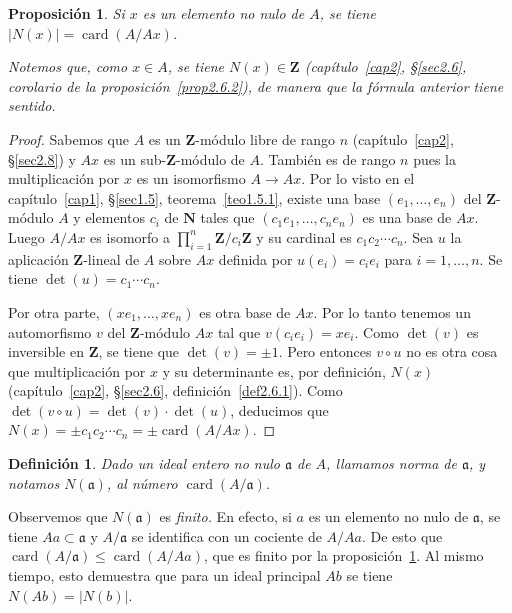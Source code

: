 \documentclass[10pt,oneside,bibtotoc,smallheadings,leqno,a5paper,DIV=12]{scrbook}
\newcommand{\ZZ}{\mathbf{Z}}
\newcommand{\NN}{\mathbf{N}}
\newcommand{\idl}[1]{\mathfrak{#1}}
\newcommand{\QED}{}%
\newcommand{\abs}[1]{\left\lvert#1\right\rvert}
\renewcommand{\to}[1][]{\xrightarrow{#1}}
\DeclareMathOperator{\card}{card}
\numberwithin{equation}{section}
\newenvironment{comm}%
	{\begin{trivlist}\item\small\itshape}
	{\end{trivlist}}
\theoremstyle{defi}
\newtheorem{definition}{Definici\'on}
\theoremstyle{enonce}
\newtheorem{proposition}{Proposici\'on}
\theoremstyle{rem}
\numberwithin{theorem}{section}
\numberwithin{proposition}{section}
\numberwithin{definition}{section}
\numberwithin{lemma}{section}
\numberwithin{corollary}{section}
\numberwithin{example}{section}
\numberwithin{footnote}{section}%
\begin{document}
\begin{proposition}\label{prop3.5.1}
Si $x$ es un elemento no nulo de $A$, se tiene $\abs{N(x)} = \card(A/Ax)$.
\end{proposition}

\begin{comm}
Notemos que, como $x\in A$, se tiene $N(x)\in\ZZ$ (cap\'itulo~\ref{cap2}, \S\ref{sec2.6}, corolario de la
proposici\'on~\ref{prop2.6.2}), de manera que
la f\'ormula anterior tiene sentido.
\end{comm}

\begin{proof}
Sabemos que $A$ es un $\ZZ$-m\'odulo libre de rango $n$ (cap\'itulo~\ref{cap2}, \S\ref{sec2.8}) y $Ax$ es un
sub-$\ZZ$-m\'odulo de $A$. Tambi\'en es de rango $n$ pues la multiplicaci\'on por $x$
es un isomorfismo $A\to Ax$. Por lo visto en el cap\'itulo~\ref{cap1}, \S\ref{sec1.5}, teorema~\ref{teo1.5.1}, existe una base
$(e_{1},\dots,e_{n})$ del $\ZZ$-m\'odulo $A$ y elementos $c_{i}$ de $\NN$ tales que
$(c_{1}e_{1},\dots,c_{n}e_{n})$ es una base de $Ax$. Luego $A/Ax$ es isomorfo a
$\prod_{i=1}^{n}\ZZ/c_{i}\ZZ$ y su cardinal es $c_{1}c_{2}\cdots c_{n}$. Sea $u$ la
aplicaci\'on $\ZZ$-lineal de $A$ sobre $Ax$ definida por $u(e_{i}) = c_{i}e_{i}$ para
$i=1,\dots,n$. Se tiene $\det(u) = c_{1}\cdots c_{n}$.

Por otra parte, $(xe_{1},\dots,xe_{n})$ es otra base de $Ax$. Por lo tanto tenemos un automorfismo
$v$ del $\ZZ$-m\'odulo $Ax$ tal que $v(c_{i}e_{i}) = xe_{i}$. Como $\det(v)$ es inversible en $\ZZ$,
se tiene que $\det(v)=\pm 1$. Pero entonces $v\circ u$ no es otra cosa que multiplicaci\'on por $x$
y su determinante es, por definici\'on, $N(x)$ (cap\'itulo~\ref{cap2}, \S\ref{sec2.6},
definici\'on~\ref{def2.6.1}). Como $\det(v\circ u)=
\det(v)\cdot\det(u)$, deducimos que $N(x) = \pm c_{1}c_{2}\cdots c_{n}=\pm \card(A/Ax)$.%
\end{proof}

\begin{definition}\label{def3.5.1}
Dado un ideal entero no nulo $\idl{a}$ de $A$, llamamos norma de $\idl{a}$, y notamos $N(\idl{a})$,
al n\'umero $\card(A/\idl{a})$.
\end{definition}

Observemos que $N(\idl{a})$ es {\em finito.} En efecto, si $a$ es un elemento no nulo de $\idl{a}$,
se tiene $Aa\subset\idl{a}$ y $A/\idl{a}$ se identifica con un cociente de $A/Aa$. De esto que
$\card(A/\idl{a})\leq\card(A/Aa)$, que es finito por la proposici\'on~\ref{prop3.5.1}. Al mismo tiempo, esto demuestra que
para un ideal principal $Ab$ se tiene $N(Ab) = \abs{N(b)}$.
\end{document}
